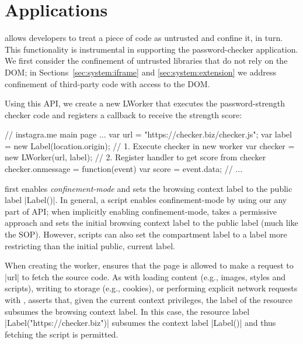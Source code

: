 
\section{Applications}
\label{sec:system:worker}

%
%
%
\sys{} allows developers to treat a piece of code as untrusted and
confine it, in turn. This functionality is instrumental in supporting
the password-checker application.
%
We first consider the confinement of untrusted libraries that do not
rely on the DOM; in Sections~\ref{sec:system:iframe} and
\ref{sec:system:extension} we address confinement of third-party code
with access to the DOM.


Using this API, we create a new LWorker that executes the
password-strength checker code and registers a callback to receive the
strength score:
\begin{jscode}
// instagra.me main page ...
var url = "https://checker.biz/checker.js";
var label = new Label(location.origin);
// 1. Execute checker in new worker
var checker = new LWorker(url, label);
// 2. Register handler to get score from checker
checker.onmessage = function(event) {
  var score = event.data; 
  // ...
}
\end{jscode}
%
\sys{} first enables \emph{confinement-mode} and sets the browsing
context label to the public label \js|Label()|.
%
In general, a script enables confinement-mode by using our any part of
API; when implicitly enabling confinement-mode, \sys{} takes a
permissive approach and sets the initial browsing context label to the
public label (much like the SOP).
%
However, scripts can also set the compartment label to a label more
restricting than the initial public, current label.
 
When creating the worker, \sys{} ensures that the page is allowed to
make a request to \js|url| to fetch the source code.
%
As with loading content (e.g., images, styles and scripts), writing to
storage (e.g., cookies), or performing explicit network requests with
\xhr{}, \sys{} asserts that, given the current context privileges, the
label of the resource subsumes the browsing context label.
%
In this case, the resource label \js|Label("https://checker.biz")|
subsumes the context label \js|Label()| and thus fetching the script
is permitted.

